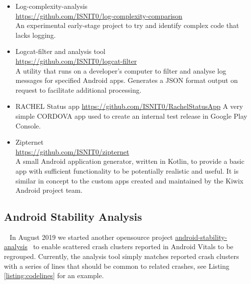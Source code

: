 \begin{itemize}
    \item Log-complexity-analysis\\ \url{https://github.com/ISNIT0/log-complexity-comparison}\\ An experimental early-stage project to try and identify complex code that lacks logging.
    \item Logcat-filter and analysis tool\\ \url{https://github.com/ISNIT0/logcat-filter}\\ A utility that runs on a developer's computer to filter and analyse log messages for specified Android apps. Generates a JSON format output on request to facilitate additional processing.
    \item RACHEL Status app \url{https://github.com/ISNIT0/RachelStatusApp} A very simple CORDOVA app used to create an internal test release in Google Play Console. 
    
    
    \item Zipternet\\ \url{https://github.com/ISNIT0/zipternet}\\ A small Android application generator, written in Kotlin, to provide a basic app with sufficient functionality to be potentially realistic and useful. It is similar in concept to the custom apps created and maintained by the Kiwix Android project team.
\end{itemize}

\begin{comment}
RACHEL Status app uses Cordova. Needed updating. Also needs to use JAVA8 compiler, see \url{https://kodejava.org/how-do-i-set-the-default-java-jdk-version-on-mac-os-x/} to set this for the CLI.
\end{comment}

\subsection{Android Stability Analysis}~\label{subsec:android-stability-analysis}
In August 2019 we started another opensource project \href{https://github.com/commercetest/android-stability-analysis}{android-stability-analysis}~\citep{android-stability-analysis} to enable scattered crash clusters reported in Android Vitals to be regrouped. Currently, the analysis tool simply matches reported crash clusters with a series of lines that should be common to related crashes, see Listing \ref{listing:codelines}  for an example.

